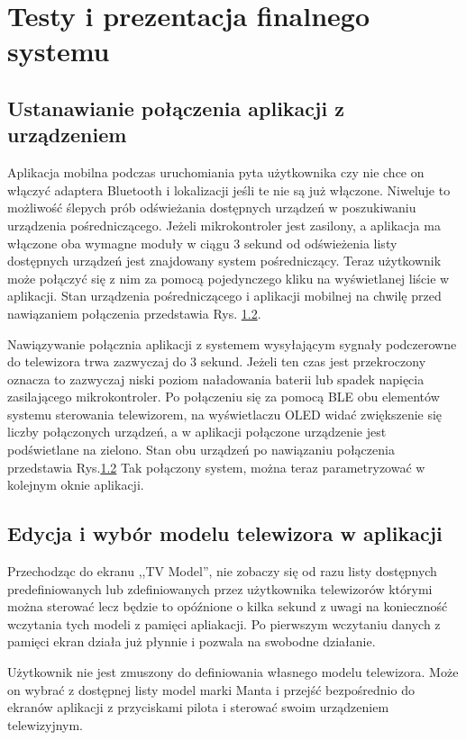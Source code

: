 \documentclass[12pt,twoside]{article}
\begin{document}

\clearpage

\section{Testy i prezentacja finalnego systemu}
\subsection{Ustanawianie połączenia aplikacji z urządzeniem}
Aplikacja mobilna podczas uruchomiania pyta użytkownika czy nie chce on włączyć adaptera Bluetooth i lokalizacji jeśli te nie są już włączone. Niweluje to możliwość ślepych prób odświeżania dostępnych urządzeń w poszukiwaniu urządzenia pośredniczącego. Jeżeli mikrokontroler jest zasilony, a aplikacja ma włączone oba wymagne moduły w ciągu 3 sekund od odświeżenia listy dostępnych urządzeń jest znajdowany system pośredniczący. Teraz użytkownik może połączyć się z nim za pomocą pojedynczego kliku na wyświetlanej liście w aplikacji. Stan urządzenia pośredniczącego i aplikacji mobilnej na chwilę przed nawiązaniem połączenia przedstawia Rys. \ref*{}.

Nawiązywanie połącznia aplikacji z systemem wysyłającym sygnały podczerowne do telewizora trwa zazwyczaj do 3 sekund. Jeżeli ten czas jest przekroczony oznacza to zazwyczaj niski poziom naładowania baterii lub spadek napięcia zasilającego mikrokontroler. Po połączeniu się za pomocą BLE obu elementów systemu sterowania telewizorem, na wyświetlaczu OLED widać zwiększenie się liczby połączonych urządzeń, a w aplikacji połączone urządzenie jest podświetlane na zielono. Stan obu urządzeń po nawiązaniu połączenia przedstawia Rys.\ref*{} Tak połączony system, można teraz parametryzować w kolejnym oknie aplikacji.
\subsection{Edycja i wybór modelu telewizora w aplikacji}
Przechodząc do ekranu ,,TV Model'', nie zobaczy się od razu listy dostępnych predefiniowanych lub zdefiniowanych przez użytkownika telewizorów którymi można sterować lecz będzie to opóźnione o kilka sekund z uwagi na konieczność wczytania tych modeli z pamięci apliakacji. Po pierwszym wczytaniu danych z pamięci ekran działa już płynnie i pozwala na swobodne działanie.

Użytkownik nie jest zmuszony do definiowania własnego modelu telewizora. Może on wybrać z dostępnej listy model marki Manta i przejść bezpośrednio do ekranów aplikacji z przyciskami pilota i sterować swoim urządzeniem telewizyjnym.
\end{document}
